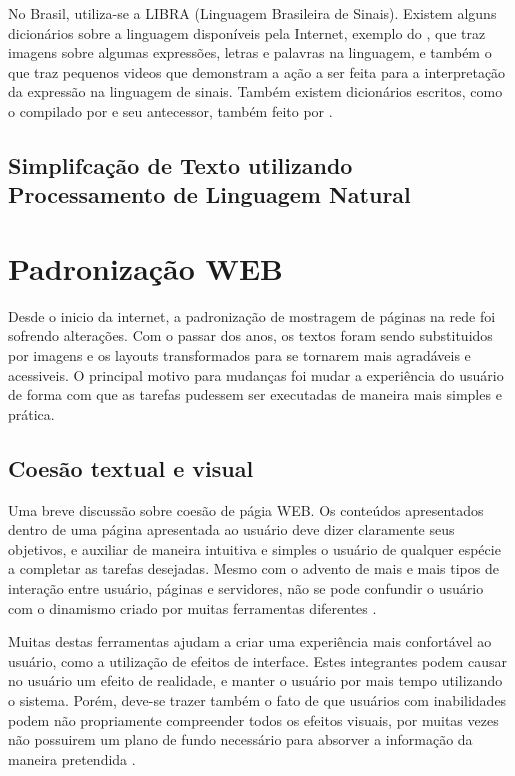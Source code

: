 \documentclass[
	12pt,				%
	oneside,			%
	a4paper,			%
	english,			%
	brazil				%
	]{abntex2ppgsi}
\begin{document}
No Brasil, utiliza-se a LIBRA (Linguagem Brasileira de Sinais). Existem alguns dicionários sobre a linguagem disponíveis pela Internet, exemplo do , que traz imagens sobre algumas expressões, letras e palavras na linguagem, e também o  que traz pequenos videos que demonstram a ação a ser feita para a interpretação da expressão na linguagem de sinais. Também existem dicionários escritos, como o compilado por  e seu antecessor, também feito por .

\section{Simplifcação de Texto utilizando Processamento de Linguagem Natural}


\chapter{Padronização WEB}

Desde o inicio da internet, a padronização de mostragem de páginas na rede foi sofrendo alterações. Com o passar dos anos, os textos foram sendo substituidos por imagens e os layouts transformados para se tornarem mais agradáveis e acessiveis. O principal motivo para mudanças foi mudar a experiência do usuário de forma com que as tarefas pudessem ser executadas de maneira mais simples e prática. 

 
\section{Coesão textual e visual}

Uma breve discussão sobre coesão de págia WEB. Os conteúdos apresentados dentro de uma página apresentada ao usuário deve dizer claramente seus objetivos, e auxiliar de maneira intuitiva e simples o usuário de qualquer espécie a completar as tarefas desejadas. Mesmo com o advento de mais e mais tipos de interação entre usuário, páginas e servidores, não se pode confundir o usuário com o dinamismo criado por muitas ferramentas diferentes \cite{webAcessibility}. 

Muitas destas ferramentas ajudam a criar uma experiência mais confortável ao usuário, como a utilização de efeitos de interface. Estes integrantes podem causar no usuário um efeito de realidade, e manter o usuário por mais tempo utilizando o sistema. Porém, deve-se trazer também o fato de que usuários com inabilidades podem não propriamente compreender todos os efeitos visuais, por muitas vezes não possuirem um plano de fundo necessário para absorver a informação da maneira pretendida \cite{deafPeople}.
\end{document}
